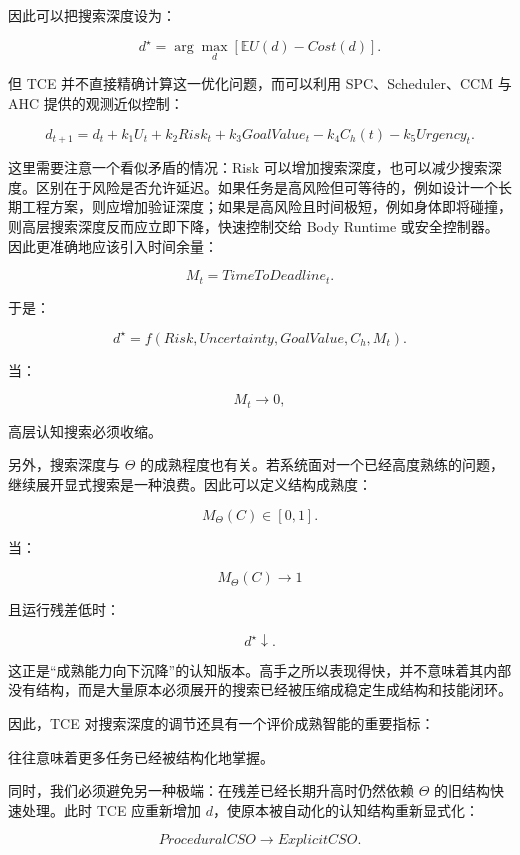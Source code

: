 因此可以把搜索深度设为：

\[
d^\star
=
\arg\max_d
\left[
\mathbb E U(d)-Cost(d)
\right].
\]

但 TCE 并不直接精确计算这一优化问题，而可以利用 SPC、Scheduler、CCM 与 AHC 提供的观测近似控制：

\[
d_{t+1}
=
d_t
+
k_1U_t
+
k_2Risk_t
+
k_3GoalValue_t
-
k_4C_h(t)
-
k_5Urgency_t.
\]

这里需要注意一个看似矛盾的情况：Risk 可以增加搜索深度，也可以减少搜索深度。区别在于风险是否允许延迟。如果任务是高风险但可等待的，例如设计一个长期工程方案，则应增加验证深度；如果是高风险且时间极短，例如身体即将碰撞，则高层搜索深度反而应立即下降，快速控制交给 Body Runtime 或安全控制器。因此更准确地应该引入时间余量：

\[
M_t
=
TimeToDeadline_t.
\]

于是：

\[
d^\star
=
f(
Risk,
Uncertainty,
GoalValue,
C_h,
M_t
).
\]

当：

\[
M_t\rightarrow0,
\]

高层认知搜索必须收缩。

另外，搜索深度与 $\Theta$ 的成熟程度也有关。若系统面对一个已经高度熟练的问题，继续展开显式搜索是一种浪费。因此可以定义结构成熟度：

\[
M_\Theta(C)\in[0,1].
\]

当：

\[
M_\Theta(C)\rightarrow1
\]

且运行残差低时：

\[
d^\star\downarrow.
\]

这正是“成熟能力向下沉降”的认知版本。高手之所以表现得快，并不意味着其内部没有结构，而是大量原本必须展开的搜索已经被压缩成稳定生成结构和技能闭环。

因此，TCE 对搜索深度的调节还具有一个评价成熟智能的重要指标：

\begin{statementbox}
\centering
{}
\end{statementbox}

往往意味着更多任务已经被结构化地掌握。

同时，我们必须避免另一种极端：在残差已经长期升高时仍然依赖 $\Theta$ 的旧结构快速处理。此时 TCE 应重新增加 $d$，使原本被自动化的认知结构重新显式化：

\[
ProceduralCSO
\rightarrow
ExplicitCSO.
\]

